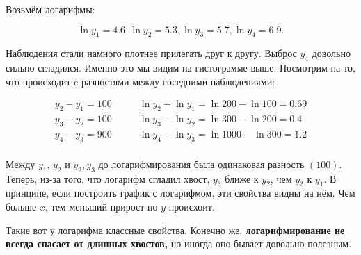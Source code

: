 \documentclass[12pt, a4paper, oneside]{article}
\theoremstyle{plain} %
\theoremstyle{definition}
\newcommand{\indef}[1]{\textbf{ \color{green} #1}}
\begin{document}
\begin{solution}
Возьмём логарифмы: 

$$
\ln y_1 = 4.6 , \ln y_2 = 5.3, \ln y_3 =5.7, \ln y_4 = 6.9.
$$

Наблюдения стали намного плотнее прилегать друг к другу. Выброс $y_4$ довольно сильно сгладился. Именно это мы видим на гистограмме выше. Посмотрим на то, что происходит c разностями между соседними наблюдениями:


\begin{align*}
    y_2 - y_1 = 100 & \qquad \ln y_2 - \ln y_1 = \ln 200 - \ln 100 = 0.69 \\
    y_3 - y_2 = 100 & \qquad \ln y_3 - \ln y_2 = \ln 300 - \ln 200 = 0.4 \\
    y_4 - y_3 = 900 & \qquad \ln y_4 - \ln y_3 = \ln 1000 - \ln 300 = 1.2 \\
\end{align*}

Между $y_1$, $y_2$ и $y_2,y_3$ до логарифмирования была одинаковая разность $(100)$. Теперь, из-за того, что логарифм сгладил хвост, $y_3$ ближе к $y_2$, чем $y_2$ к $y_1$. В принципе, если построить график с логарифмом, эти свойства видны на нём. Чем больше $x$, тем меньший прирост по $y$ происхоит.

\begin{center}
\end{center}
	
Такие вот у логарифма классные свойства. Конечно же, \indef{логарифмирование не всегда спасает от длинных хвостов,} но иногда оно бывает довольно полезным. 
\end{solution}
\end{document}
